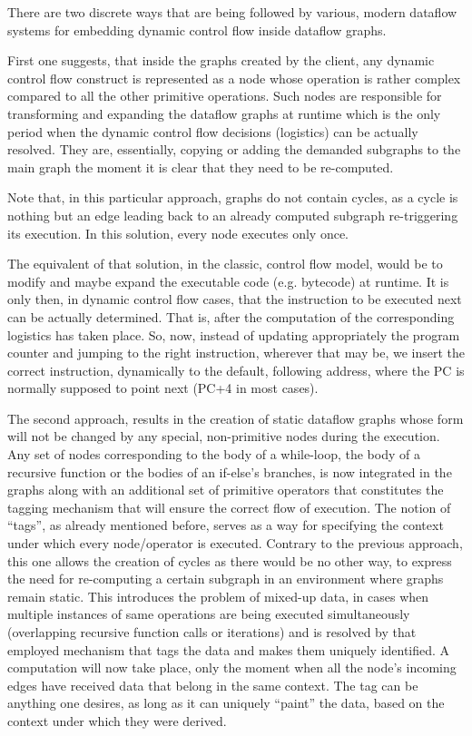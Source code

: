 \documentclass[ack,preface]{dithesis}
\begin{document}
There are two discrete ways that are being followed by various, modern dataflow systems for embedding dynamic control flow inside dataflow graphs. 

First one suggests, that inside the graphs created by the client, any dynamic control flow construct is represented as a node whose operation is rather complex compared to all the other primitive operations. Such nodes are responsible for transforming and expanding the dataflow graphs at runtime which is the only period when the dynamic control flow decisions (logistics) can be actually resolved. They are, essentially, copying or adding the demanded subgraphs to the main graph the moment it is clear that they need to be re-computed.

Note that, in this particular approach, graphs do not contain cycles, as a cycle is nothing but an edge leading back to an already computed subgraph re-triggering its execution. In this solution, every node executes only once.

The equivalent of that solution, in the classic, control flow model, would be to modify and maybe expand the executable code (e.g. bytecode) at runtime. It is only then, in dynamic control flow cases, that the instruction to be executed next can be actually determined. That is, after the computation of the corresponding logistics has taken place. So, now, instead of updating appropriately the program counter and jumping to the right instruction, wherever that may be, we insert the correct instruction, dynamically to the default, following address, where the PC is normally supposed to point next (PC+4 in most cases).

The second approach, results in the creation of static dataflow graphs whose form will not be changed by any special, non-primitive nodes during the execution. Any set of nodes corresponding to the body of a while-loop, the body of a recursive function or the bodies of an if-else’s branches, is now integrated in the graphs along with an additional set of primitive operators that constitutes the tagging mechanism that will ensure the correct flow of execution. The notion of “tags”, as already mentioned before, serves as a way for specifying the context under which every node/operator is executed. Contrary to the previous approach, this one allows the creation of cycles as there would be no other way, to express the need for re-computing a certain subgraph in an environment where graphs remain static. This introduces the problem of mixed-up data, in cases when multiple instances of same operations are being executed simultaneously (overlapping recursive function calls or iterations) and is resolved by that employed mechanism that tags the data and makes them uniquely identified. A computation will now take place, only the moment when all the node’s incoming edges have received data that belong in the same context. The tag can be anything one desires, as long as it can uniquely “paint” the data, based on the context under which they were derived.
\end{document}
